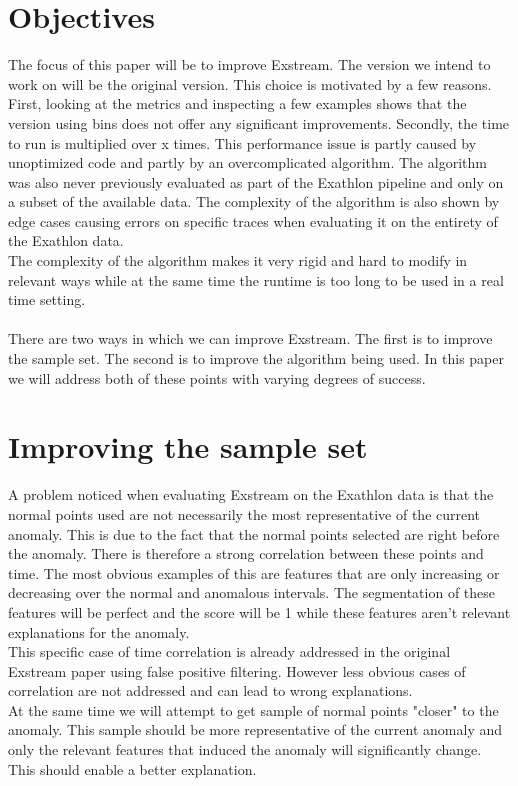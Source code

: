\documentclass[oneside, a4paper, onecolumn, 11pt]{article}
\begin{document}
\section{Objectives}
The focus of this paper will be to improve Exstream. The version we intend to work on will be the original version. This choice is motivated by a few reasons. \\
First, looking at the metrics and inspecting a few examples shows that the version using bins does not offer any significant improvements. 
Secondly, the time to run is multiplied over x times. This performance issue is partly caused by unoptimized code and partly by an overcomplicated algorithm. The algorithm was also never previously evaluated as part of the Exathlon pipeline and only on a subset of the available data. 
The complexity of the algorithm is also shown by edge cases causing errors on specific traces when evaluating it on the entirety of the Exathlon data. \\
The complexity of the algorithm makes it very rigid and hard to modify in relevant ways while at the same time the runtime is too long to be used in a real time setting.\\\\
There are two ways in which we can improve Exstream. The first is to improve the sample set. The second is to improve the algorithm being used. In this paper we will address both of these points with varying degrees of success.\\
\section{Improving the sample set}
A problem noticed when evaluating Exstream on the Exathlon data is that the normal points used are not necessarily the most representative of the current anomaly. This is due to the fact that the normal points selected are right before the anomaly. There is therefore a strong correlation between these points and time. The most obvious examples of this are features that are only increasing or decreasing over the normal and anomalous intervals. The segmentation of these features will be perfect and the score will be 1 while these features aren't relevant explanations for the anomaly.\\
This specific case of time correlation is already addressed in the original Exstream paper using false positive filtering. However less obvious cases of correlation are not addressed and can lead to wrong explanations.\\
At the same time we will attempt to get sample of normal points "closer" to the anomaly. This sample should be more representative of the current anomaly and only the relevant features that induced the anomaly will significantly change. This should enable a better explanation.\\
\end{document}
